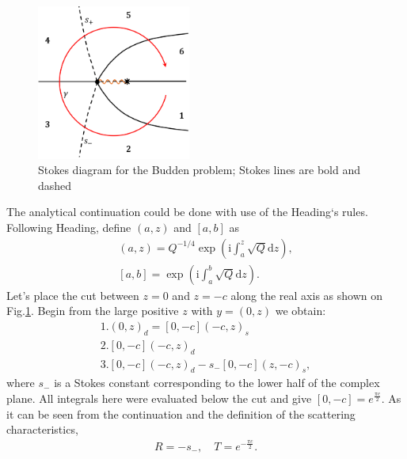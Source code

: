 \documentclass[aip,jmp,reprint]{revtex4-1}
\def\rmi{\mathrm{i}}
\def\rmd{\mathrm{d}}
\def\mytextwidth{0.45\textwidth}
\begin{document}
\begin{figure}
\centering
\noindent
\includegraphics[width=\mytextwidth]{stuff/sd.png}
\caption{Stokes diagram for the Budden problem; Stokes lines are bold and dashed}
\label{fig:diagram}
\end{figure} 

The analytical continuation could be done with use of the Heading`s rules. 
Following Heading\cite{heading}, define $(a,z)$ and $[a,b]$ as
\begin{eqnarray}
(a,z) = Q^{-1/4}\exp \left( \rmi \int_a^z \sqrt{Q} \rmd z \right),
\\
\left[a,b\right] = \exp \left( \rmi \int_a^b \sqrt{Q} \rmd z \right). 
\end{eqnarray}
Let's place the cut between $z=0$ and $z=-c$ 
along the real axis as shown on Fig.\ref{fig:diagram}. Begin from the large positive $z$ 
with $y=(0,z)$ we obtain:
\begin{eqnarray}
1.(0,z)_d=[0,-c](-c,z)_s \nonumber
\\
2.[0,-c](-c,z)_d \nonumber
\\
3.[0,-c](-c,z)_d - s_-[0,-c](z,-c)_s \nonumber,
\end{eqnarray}
where $s_-$ is a Stokes constant corresponding to the lower half of the complex plane. 
All integrals here were evaluated below the cut and give $[0,-c]=e^{\frac{\pi c}{2}}$. As it
can be seen from the continuation and the definition of the scattering characteristics,
\begin{eqnarray}
R = -s_-, \quad T = e^{-\frac{\pi c}{2}}.
\label{eq:scattr}
\end{eqnarray}
\end{document}
